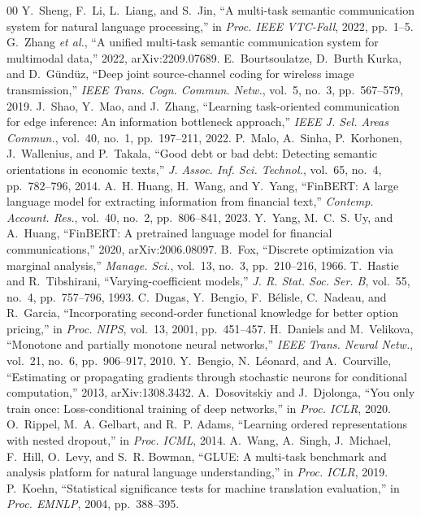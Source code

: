 \documentclass[conference]{IEEEtran}
\begin{document}
\begin{thebibliography}{00}
 Y.~Sheng, F.~Li, L.~Liang, and S.~Jin, ``A multi-task semantic communication system for natural language processing,'' in \emph{Proc. IEEE VTC-Fall}, 2022, pp.~1--5.
 G.~Zhang \emph{et al.}, ``A unified multi-task semantic communication system for multimodal data,'' 2022, arXiv:2209.07689.
 E.~Bourtsoulatze, D.~Burth Kurka, and D.~G\"und\"uz, ``Deep joint source-channel coding for wireless image transmission,'' \emph{IEEE Trans. Cogn. Commun. Netw.}, vol.~5, no.~3, pp.~567--579, 2019.
 J.~Shao, Y.~Mao, and J.~Zhang, ``Learning task-oriented communication for edge inference: An information bottleneck approach,'' \emph{IEEE J. Sel. Areas Commun.}, vol.~40, no.~1, pp.~197--211, 2022.
 P.~Malo, A.~Sinha, P.~Korhonen, J.~Wallenius, and P.~Takala, ``Good debt or bad debt: Detecting semantic orientations in economic texts,'' \emph{J. Assoc. Inf. Sci. Technol.}, vol.~65, no.~4, pp.~782--796, 2014.
 A.~H. Huang, H.~Wang, and Y.~Yang, ``FinBERT: A large language model for extracting information from financial text,'' \emph{Contemp. Account. Res.}, vol.~40, no.~2, pp.~806--841, 2023.
 Y.~Yang, M.~C.~S. Uy, and A.~Huang, ``FinBERT: A pretrained language model for financial communications,'' 2020, arXiv:2006.08097.
 B.~Fox, ``Discrete optimization via marginal analysis,'' \emph{Manage. Sci.}, vol.~13, no.~3, pp.~210--216, 1966.
 T.~Hastie and R.~Tibshirani, ``Varying-coefficient models,'' \emph{J. R. Stat. Soc. Ser. B}, vol.~55, no.~4, pp.~757--796, 1993.
 C.~Dugas, Y.~Bengio, F.~B\'elisle, C.~Nadeau, and R.~Garcia, ``Incorporating second-order functional knowledge for better option pricing,'' in \emph{Proc. NIPS}, vol.~13, 2001, pp.~451--457.
 H.~Daniels and M.~Velikova, ``Monotone and partially monotone neural networks,'' \emph{IEEE Trans. Neural Netw.}, vol.~21, no.~6, pp.~906--917, 2010.
 Y.~Bengio, N.~L\'eonard, and A.~Courville, ``Estimating or propagating gradients through stochastic neurons for conditional computation,'' 2013, arXiv:1308.3432.
 A.~Dosovitskiy and J.~Djolonga, ``You only train once: Loss-conditional training of deep networks,'' in \emph{Proc. ICLR}, 2020.
 O.~Rippel, M.~A. Gelbart, and R.~P. Adams, ``Learning ordered representations with nested dropout,'' in \emph{Proc. ICML}, 2014.
 A.~Wang, A.~Singh, J.~Michael, F.~Hill, O.~Levy, and S.~R. Bowman, ``GLUE: A multi-task benchmark and analysis platform for natural language understanding,'' in \emph{Proc. ICLR}, 2019.
 P.~Koehn, ``Statistical significance tests for machine translation evaluation,'' in \emph{Proc. EMNLP}, 2004, pp.~388--395.
\end{thebibliography}
\end{document}
